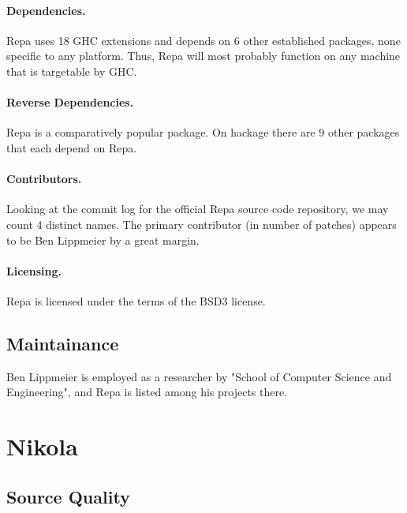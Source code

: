 \paragraph{Dependencies.} %
Repa uses 18 GHC extensions and depends on 6 other established packages, none
specific to any platform. Thus, Repa will most probably function on any
machine that is targetable by GHC.

\paragraph{Reverse Dependencies.} Repa is a comparatively popular package. On
hackage there are 9 other packages that each depend on Repa.

\paragraph{Contributors.} Looking at the commit log for the official Repa
source code repository, we may count 4 distinct names. The primary contributor
(in number of patches) appears to be Ben Lippmeier by a great margin.


\paragraph{Licensing.} Repa is licensed under the terms of the BSD3 license.

\subsection{Maintainance}
Ben Lippmeier is employed as a researcher by "School of Computer Science and
Engineering", and Repa is listed among his projects there.

\section{Nikola}

\subsection{Source Quality}

